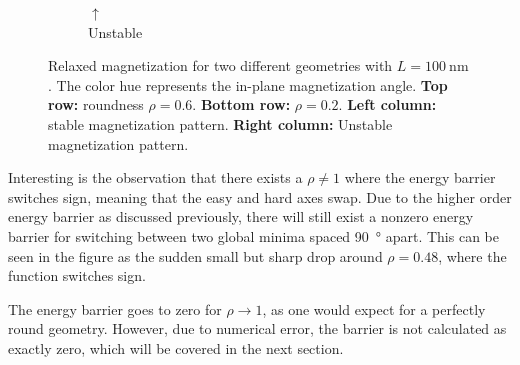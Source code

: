 \documentclass[11pt,a4paper,english]{article}
\begin{document}
\begin{figure}
\begin{subfigure}[b]{0.2\textwidth}
         \caption*{$\uparrow$\\Unstable}
         \label{fig:barrier-magnetization-20x100_ortho}
     \end{subfigure}
    \caption{Relaxed magnetization for two different geometries with $L=\SI{100}{\nano\metre}$. The color hue represents the in-plane magnetization angle. \textbf{Top row:} roundness $\rho=0.6$. \textbf{Bottom row:} $\rho=0.2$. \textbf{Left column:} stable magnetization pattern. \textbf{Right column:} Unstable magnetization pattern.}
    \label{fig:barrier-magnetization}
\end{figure}
Interesting is the observation that there exists a $\rho \neq 1$ where the energy barrier switches sign, meaning that the easy and hard axes swap. Due to the higher order energy barrier as discussed previously, there will still exist a nonzero energy barrier for switching between two global minima spaced \SI{90}{\degree} apart. This can be seen in the figure as the sudden small but sharp drop around $\rho = 0.48$, where the function switches sign.

The energy barrier goes to zero for $\rho \rightarrow 1$, as one would expect for a perfectly round geometry. However, due to numerical error, the barrier is not calculated as exactly zero, which will be covered in the next section.
\end{document}
